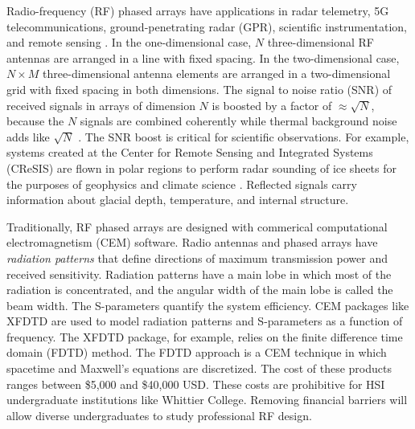 \documentclass[11pt]{amsart}
\begin{document}
Radio-frequency (RF) phased arrays have applications in radar telemetry, 5G telecommunications, ground-penetrating radar (GPR), scientific instrumentation, and remote sensing \cite{Vieregg_2016,AVVA201746,arnold_2020,PhysRevD.105.122006,10.3390/s21186091,10.1016/j.jappgeo.2022.104876,phased_array_book}.  In the one-dimensional case, $N$ three-dimensional RF antennas are arranged in a line with fixed spacing.  In the two-dimensional case, $N \times M$ three-dimensional antenna elements are arranged in a two-dimensional grid with fixed spacing in both dimensions.  The signal to noise ratio (SNR) of received signals in arrays of dimension $N$ is boosted by a factor of $\approx \sqrt{N}$, because the $N$ signals are combined coherently while thermal background noise adds like $\sqrt{N}$ \cite{AVVA201746}.  The SNR boost is critical for scientific observations.  For example, systems created at the Center for Remote Sensing and Integrated Systems (CReSIS) are flown in polar regions to perform radar sounding of ice sheets for the purposes of geophysics and climate science \cite{arnold_2020}.  Reflected signals carry information about glacial depth, temperature, and internal structure.  

Traditionally, RF phased arrays are designed with commerical computational electromagnetism (CEM) software.  Radio antennas and phased arrays have \textit{radiation patterns} that define directions of maximum transmission power and received sensitivity.  Radiation patterns have a main lobe in which most of the radiation is concentrated, and the angular width of the main lobe is called the beam width.  The S-parameters quantify the system efficiency.  CEM packages like XFDTD are used to model radiation patterns and S-parameters as a function of frequency.  The XFDTD package, for example, relies on the finite difference time domain (FDTD) method. The FDTD approach is a CEM technique in which spacetime and Maxwell’s equations are discretized.  The cost of these products ranges between \$5,000 and \$40,000 USD.  These costs are prohibitive for HSI undergraduate institutions like Whittier College.  Removing financial barriers will allow diverse undergraduates to study professional RF design. 
\end{document}

